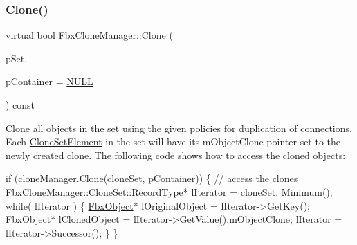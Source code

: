 \subsubsection{\texorpdfstring{Clone()}{Clone()}\hspace{0.1cm}{\footnotesize\ttfamily [2/3]}}
{\footnotesize\ttfamily virtual bool Fbx\+Clone\+Manager\+::\+Clone (\begin{DoxyParamCaption}\item[{\hyperlink{class_fbx_clone_manager_aeb8a9c04c9c36eb7e551186a0b18f10d}{Clone\+Set} \&}]{p\+Set,  }\item[{\hyperlink{class_fbx_object}{Fbx\+Object} $\ast$}]{p\+Container = {\ttfamily \hyperlink{fbxarch_8h_a070d2ce7b6bb7e5c05602aa8c308d0c4}{N\+U\+LL}} }\end{DoxyParamCaption}) const\hspace{0.3cm}{\ttfamily [virtual]}}

Clone all objects in the set using the given policies for duplication of connections. Each \hyperlink{struct_fbx_clone_manager_1_1_clone_set_element}{Clone\+Set\+Element} in the set will have its m\+Object\+Clone pointer set to the newly created clone. The following code shows how to access the cloned objects\+:


\begin{DoxyCode}
\textcolor{keywordflow}{if} (cloneManager.\hyperlink{class_fbx_clone_manager_a2fd72cbf71c6dd3105310445c1a7c2b1}{Clone}(cloneSet, pContainer))
\{
    \textcolor{comment}{// access the clones}
    \hyperlink{class_fbx_map_af8fc887461b3bf29f41aa36d15ddb54f}{FbxCloneManager::CloneSet::RecordType}* lIterator = cloneSet.
      \hyperlink{class_fbx_map_a12efe88fe10227cf0aca2284a3474193}{Minimum}();
    \textcolor{keywordflow}{while}( lIterator )
    \{
        \hyperlink{class_fbx_object}{FbxObject}* lOriginalObject = lIterator->GetKey();
        \hyperlink{class_fbx_object}{FbxObject}* lClonedObject   = lIterator->GetValue().mObjectClone;
        lIterator = lIterator->Successor();
    \}
\}
\end{DoxyCode}



